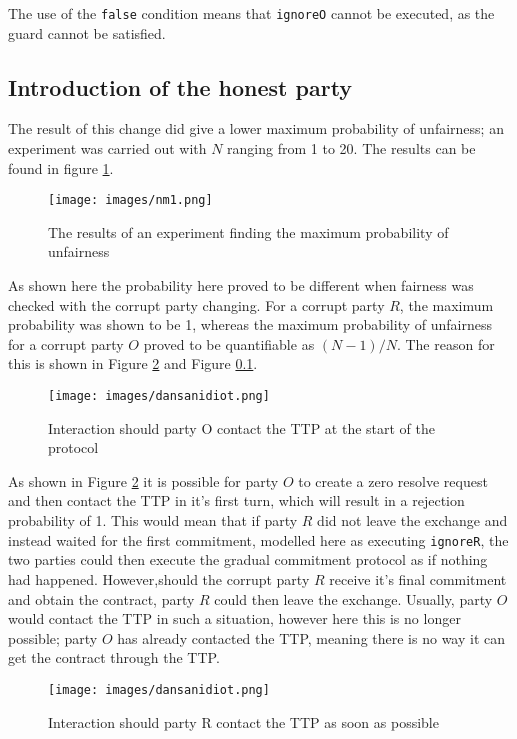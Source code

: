 \documentclass{l4proj}
\begin{document}
The use of the {\tt false} condition means that {\tt ignoreO} cannot be executed, as the guard cannot be satisfied. 

\subsection{Introduction of the honest party}

The result of this change did give a lower maximum probability of unfairness; an experiment was carried out with $N$ ranging from 1 to 20. The results can be found in figure \ref{NM!}.

\begin{figure}[h!]
\centering
\texttt{[image: images/nm1.png]}
\caption{The results of an experiment finding the maximum probability of unfairness}
\label{NM!}
\end{figure}

As shown here the probability here proved to be different when fairness was checked with the corrupt party changing. For a corrupt party $R$, the maximum probability was shown to be 1, whereas the maximum probability of unfairness for a corrupt party $O$ proved to be quantifiable as $(N-1)/N$. The reason for this is shown in Figure \ref{misfireO} and Figure \ref{}.

\begin{figure}[h!]
\centering
\texttt{[image: images/dansanidiot.png]}
\caption{Interaction should party O contact the TTP at the start of the protocol }
\label{misfireO}
\end{figure}

As shown in Figure \ref{misfireO} it is possible for party $O$ to create a zero resolve request and then contact the TTP in it's first turn, which will result in a rejection probability of 1. This would mean that if party $R$ did not leave the exchange and instead waited for the first commitment, modelled here as executing {\tt ignoreR}, the two parties could then execute the gradual commitment protocol as if nothing had happened. However,should the corrupt party $R$ receive it's final commitment and obtain the contract, party $R$ could then leave the exchange. Usually, party $O$ would contact the TTP in such a situation, however here this is no longer possible; party $O$ has already contacted the TTP, meaning there is no way it can get the contract through the TTP.

\begin{figure}[h!]
\centering
\texttt{[image: images/dansanidiot.png]}
\caption{Interaction should party R contact the TTP as soon as possible }
\label{misfireR}
\end{figure}
\end{document}
